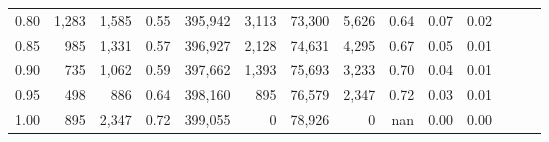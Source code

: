 \begin{tabular}{rrrrrrrrrrrrrr}
0.80 &   1,283 &  1,585 &  0.55 &  395,942 &    3,113 &  73,300 &   5,626 &  0.64 &  0.07 &      0.02 \\
0.85 &     985 &  1,331 &  0.57 &  396,927 &    2,128 &  74,631 &   4,295 &  0.67 &  0.05 &      0.01 \\
0.90 &     735 &  1,062 &  0.59 &  397,662 &    1,393 &  75,693 &   3,233 &  0.70 &  0.04 &      0.01 \\
0.95 &     498 &    886 &  0.64 &  398,160 &      895 &  76,579 &   2,347 &  0.72 &  0.03 &      0.01 \\
1.00 &     895 &  2,347 &  0.72 &  399,055 &        0 &  78,926 &       0 &   nan &  0.00 &      0.00 \\
\bottomrule
\end{tabular}
